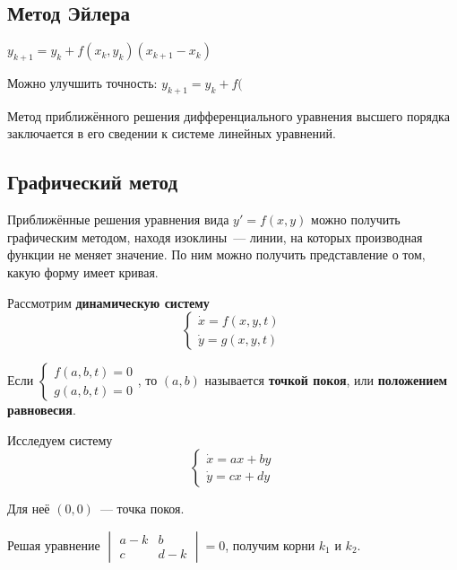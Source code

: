 \subsection{Метод Эйлера}
$y_{k+1} = y_k + f(x_k, y_k) (x_{k+1} - x_k)$

Можно улучшить точность:
$y_{k+1} = y_k + f($

Метод приближённого решения дифференциального уравнения высшего порядка заключается в его сведении к системе линейных уравнений.

\subsection{Графический метод}
Приближённые решения уравнения вида $y' = f(x, y)$ можно получить графическим методом, находя изоклины~--- линии, на которых производная функции не меняет значение.
По ним можно получить представление о том, какую форму имеет кривая.

Рассмотрим \textbf{динамическую систему}
\begin{equation*}
\begin{cases}
\dot x = f(x, y, t) \\
\dot y = g(x, y, t)
\end{cases}
\end{equation*}

Если
$\begin{cases}
f(a, b, t) = 0 \\
g(a, b, t) = 0
\end{cases}$, то $(a, b)$ называется \textbf{точкой покоя}, или \textbf{положением равновесия}.

Исследуем систему
\begin{equation*}
\begin{cases}
\dot x = ax + by \\
\dot y = cx + dy
\end{cases}
\end{equation*}

Для неё $(0, 0)$~--- точка покоя.

Решая уравнение
$\begin{vmatrix}
a - k & b \\
c & d - k
\end{vmatrix} = 0$, получим корни $k_1$ и $k_2$.

